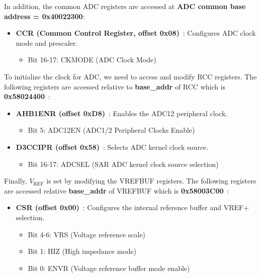 \documentclass[12pt,a4paper]{article}
\begin{document}
In addition, the common ADC registers are accessed at \textbf{ADC common base address = 0x40022300}:

\begin{itemize}
    \item \textbf{CCR (Common Control Register, offset 0x08)}~\cite[pp.~918]{ref-manual}: Configures ADC clock mode and prescaler.
    \begin{itemize}
        \item Bit 16-17: CKMODE (ADC Clock Mode)
    \end{itemize}
\end{itemize}

To initialize the clock for ADC, we need to access and modify RCC registers. The following registers are accessed relative to \textbf{base\_addr} of RCC which is \textbf{0x58024400}~\cite[pp.~132]{ref-manual}:

\begin{itemize}
    \item \textbf{AHB1ENR (offset 0xD8)}~\cite[pp.~467]{ref-manual}: Enables the ADC12 peripheral clock.
    \begin{itemize}
        \item Bit 5: ADC12EN (ADC1/2 Peripheral Clocks Enable)
    \end{itemize}
    \item \textbf{D3CCIPR (offset 0x58)}~\cite[pp.~417]{ref-manual}: Selects ADC kernel clock source.
    \begin{itemize}
        \item Bit 16-17: ADCSEL (SAR ADC kernel clock source selection)
    \end{itemize}
\end{itemize}

Finally, $V_{\text{REF}}$ is set by modifying the VREFBUF registers. The following registers are accessed relative \textbf{base\_addr} of VREFBUF which is \textbf{0x58003C00}~\cite[pp.~133]{ref-manual}:

\begin{itemize}

    \item \textbf{CSR (offset 0x00)}~\cite[pp.~297]{ref-manual}: Configures the internal reference buffer and VREF+ selection.
    \begin{itemize}
        \item Bit 4-6: VRS (Voltage reference scale)
        \item Bit 1: HIZ (High impedance mode)
        \item Bit 0: ENVR (Voltage reference buffer mode enable)
    \end{itemize}
\end{itemize}
\end{document}
